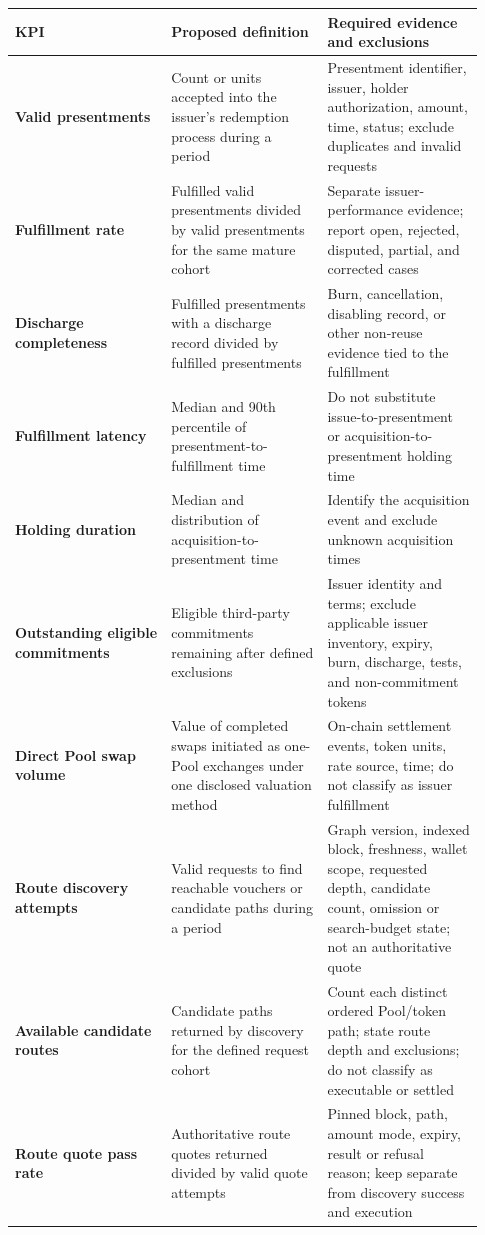 \documentclass[11pt]{article}
\begin{document}
\begin{longtable}{P{0.31\linewidth} P{0.31\linewidth} P{0.31\linewidth}}
\toprule
KPI & Proposed definition & Required evidence and exclusions \\
\midrule
\endhead
\textbf{Valid presentments} & Count or units accepted into the issuer's redemption process during a period & Presentment identifier, issuer, holder authorization, amount, time, status; exclude duplicates and invalid requests \\
\textbf{Fulfillment rate} & Fulfilled valid presentments divided by valid presentments for the same mature cohort & Separate issuer-performance evidence; report open, rejected, disputed, partial, and corrected cases \\
\textbf{Discharge completeness} & Fulfilled presentments with a discharge record divided by fulfilled presentments & Burn, cancellation, disabling record, or other non-reuse evidence tied to the fulfillment \\
\textbf{Fulfillment latency} & Median and 90th percentile of presentment-to-fulfillment time & Do not substitute issue-to-presentment or acquisition-to-presentment holding time \\
\textbf{Holding duration} & Median and distribution of acquisition-to-presentment time & Identify the acquisition event and exclude unknown acquisition times \\
\textbf{Outstanding eligible commitments} & Eligible third-party commitments remaining after defined exclusions & Issuer identity and terms; exclude applicable issuer inventory, expiry, burn, discharge, tests, and non-commitment tokens \\
\textbf{Direct Pool swap volume} & Value of completed swaps initiated as one-Pool exchanges under one disclosed valuation method & On-chain settlement events, token units, rate source, time; do not classify as issuer fulfillment \\
\textbf{Route discovery attempts} & Valid requests to find reachable vouchers or candidate paths during a period & Graph version, indexed block, freshness, wallet scope, requested depth, candidate count, omission or search-budget state; not an authoritative quote \\
\textbf{Available candidate routes} & Candidate paths returned by discovery for the defined request cohort & Count each distinct ordered Pool/token path; state route depth and exclusions; do not classify as executable or settled \\
\textbf{Route quote pass rate} & Authoritative route quotes returned divided by valid quote attempts & Pinned block, path, amount mode, expiry, result or refusal reason; keep separate from discovery success and execution \\

\end{longtable}
\end{document}
